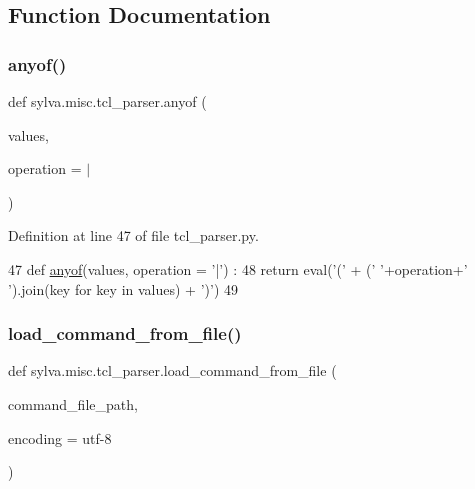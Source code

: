 \subsection{Function Documentation}
\mbox{\label{namespacesylva_1_1misc_1_1tcl__parser_abc9d84dd4132e13b642242dfac628084}} 
\subsubsection{\texorpdfstring{anyof()}{anyof()}}
{\footnotesize\ttfamily def sylva.\+misc.\+tcl\+\_\+parser.\+anyof (\begin{DoxyParamCaption}\item[{}]{values,  }\item[{}]{operation = {\ttfamily \textquotesingle{}$\vert$\textquotesingle{}} }\end{DoxyParamCaption})}



Definition at line 47 of file tcl\+\_\+parser.\+py.


\begin{DoxyCode}
47   \textcolor{keyword}{def }\hyperlink{namespacesylva_1_1misc_1_1tcl__parser_abc9d84dd4132e13b642242dfac628084}{anyof}(values, operation = '|') :
48     \textcolor{keywordflow}{return} eval(\textcolor{stringliteral}{'('} + (\textcolor{stringliteral}{' '}+operation+\textcolor{stringliteral}{' '}).join(key \textcolor{keywordflow}{for} key \textcolor{keywordflow}{in} values) + \textcolor{stringliteral}{')'})
49 
\end{DoxyCode}
\mbox{\label{namespacesylva_1_1misc_1_1tcl__parser_a3a51f30aa622037c144676d280943caa}} 
\subsubsection{\texorpdfstring{load\+\_\+command\+\_\+from\+\_\+file()}{load\_command\_from\_file()}}
{\footnotesize\ttfamily def sylva.\+misc.\+tcl\+\_\+parser.\+load\+\_\+command\+\_\+from\+\_\+file (\begin{DoxyParamCaption}\item[{}]{command\+\_\+file\+\_\+path,  }\item[{}]{encoding = {\ttfamily \textquotesingle{}utf-\/8\textquotesingle{}} }\end{DoxyParamCaption})}



